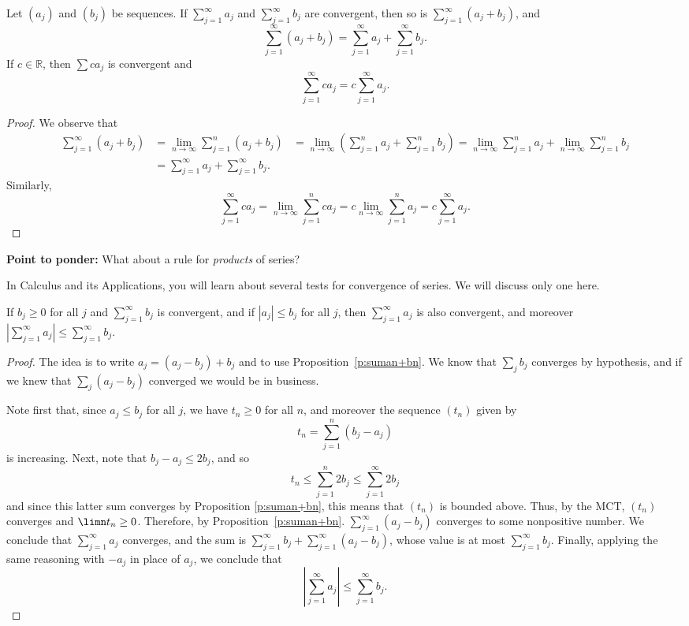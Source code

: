 \documentclass[11pt,dvipsnames]{book}
\numberwithin{figure}{section} %
\numberwithin{table}{section} %
\begin{document}
\begin{proposition}
\label{p:suman+bn}
Let $(a_{j})$ and $(b_{j})$ be sequences. If $\sum_{j=1}^\infty a_{j}$ and $\sum_{j=1}^\infty b_{j}$ are convergent, then so is $\sum_{j=1}^\infty (a_{j}+b_{j})$, and
\[
\sum_{j=1}^{\infty} (a_{j}+b_{j})=\sum_{j=1}^{\infty} a_{j}+\sum_{j=1}^{\infty} b_{j}.
\]
If $c\in\mathbb{R}$, then $\sum ca_{j}$ is convergent and
\[
\sum_{j=1}^{\infty} ca_{j}=c
\sum_{j=1}^{\infty} a_{j}.
\]

\end{proposition}

\begin{proof}
We observe that
\begin{align*}
\sum_{j=1}^{\infty} (a_{j}+b_{j}) & = \lim_{n\rightarrow\infty} \sum_{j=1}^{n}(a_{j}+b_{j})
& =\lim_{n\rightarrow\infty} \left(\sum_{j=1}^{n} a_{j}+\sum_{j=1}^{n}b_{j}\right)
=\lim_{n\rightarrow\infty} \sum_{j=1}^{n} a_{j}+\lim_{n\rightarrow\infty}\sum_{j=1}^{n}b_{j}\\
& =\sum_{j=1}^{\infty} a_{j}+\sum_{j=1}^{\infty}b_{j}.
\end{align*}
Similarly,
\[
\sum_{j=1}^{\infty} ca_{j}
=\lim_{n\rightarrow\infty}\sum_{j=1}^{n} ca_{j}
=c\lim_{n\rightarrow\infty}\sum_{j=1}^{n} a_{j}
=c\sum_{j=1}^{\infty} a_{j}.
\]
\end{proof}
\noindent
{\bf Point to ponder:} What about a rule for {\em products} of series?

\medskip
In Calculus and its Applications, you will learn about several tests for convergence of series. We will discuss only one here.

\begin{theorem}
If $b_j \geq 0$ for all $j$ and $\sum_{j=1}^\infty b_{j}$ is convergent, and if $|a_{j}|\leq b_{j}$ for all $j$, then $\sum_{j=1}^\infty a_{j}$ is also convergent, and
moreover $ |\sum_{j=1}^\infty a_j| \leq \sum_{j=1}^\infty b_j.$
\end{theorem}

\begin{proof}
The idea is to write $a_j = (a_j - b_j) + b_j$ and to use Proposition~\ref{p:suman+bn}. We know that $\sum_j b_j$ converges by hypothesis, and if we knew that $\sum_j(a_j - b_j)$ converged we would be in business.

Note first that, since $a_j \leq b_j$ for all $j$, we have $t_n \geq 0$ for all $n$, and moreover the sequence $(t_n)$ given by
\[
t_{n}=\sum_{j=1}^{n}(b_{j}-a_{j})
\]
is increasing. Next, note that $b_{j}-a_{j}\leq 2b_{j}$, and so
\[
t_{n}\leq \sum_{j=1}^{n}2b_{j}\leq \sum_{j=1}^{\infty}2b_{j}\]
and since this latter sum converges by Proposition \ref{p:suman+bn}, this means that $(t_{n})$ is bounded above. Thus, by the MCT, $(t_{n})$ converges
and $\limn t_n \geq 0$. Therefore, by Proposition~\ref{p:suman+bn}. $\sum_{j=1}^\infty(a_j - b_j)$
converges to some nonpositive number.
We conclude that $\sum_{j=1}^\infty a_{j}$ converges, and the sum is $\sum_{j=1}^\infty b_j + \sum_{j=1}^\infty (a_j - b_j)$, whose value is at most $\sum_{j=1}^\infty b_j$. Finally, applying the same reasoning with $-a_j$ in place of $a_j$, we conclude that
\[
|\sum_{j=1}^\infty a_j| \leq \sum_{j=1}^\infty b_j.
\]
\end{proof}
\end{document}

